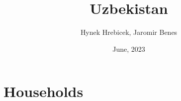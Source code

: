 \documentclass[14pt]{beamer}
\title{Uzbekistan}
\institute{DSGE model for an open economy}
\author{Hynek Hrebicek, Jaromir Benes}
\date{June, 2023}
\begin{document}
\maketitle


%
%   

\section{Households}
  
\end{document}
